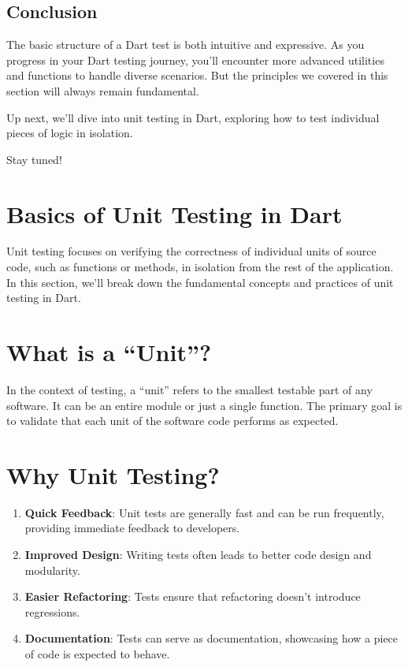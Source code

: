 \documentclass[
]{article}
\providecommand{\tightlist}{%
  \setlength{\itemsep}{0pt}\setlength{\parskip}{0pt}}
\begin{document}
\subsection{Conclusion}\label{conclusion-2}

The basic structure of a Dart test is both intuitive and expressive. As
you progress in your Dart testing journey, you'll encounter more
advanced utilities and functions to handle diverse scenarios. But the
principles we covered in this section will always remain fundamental.

Up next, we'll dive into unit testing in Dart, exploring how to test
individual pieces of logic in isolation.

Stay tuned!

\section{Basics of Unit Testing in
Dart}\label{basics-of-unit-testing-in-dart}

Unit testing focuses on verifying the correctness of individual units of
source code, such as functions or methods, in isolation from the rest of
the application. In this section, we'll break down the fundamental
concepts and practices of unit testing in Dart.

\section{What is a ``Unit''?}\label{what-is-a-unit}

In the context of testing, a ``unit'' refers to the smallest testable
part of any software. It can be an entire module or just a single
function. The primary goal is to validate that each unit of the software
code performs as expected.

\section{Why Unit Testing?}\label{why-unit-testing}

\begin{enumerate}
\def\labelenumi{\arabic{enumi}.}
\tightlist
\item
  \textbf{Quick Feedback}: Unit tests are generally fast and can be run
  frequently, providing immediate feedback to developers.
\item
  \textbf{Improved Design}: Writing tests often leads to better code
  design and modularity.
\item
  \textbf{Easier Refactoring}: Tests ensure that refactoring doesn't
  introduce regressions.
\item
  \textbf{Documentation}: Tests can serve as documentation, showcasing
  how a piece of code is expected to behave.
\end{enumerate}
\end{document}

